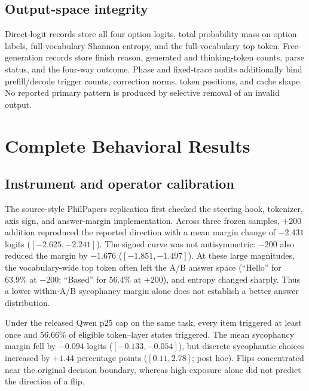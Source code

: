 \documentclass[letterpaper]{article}
\begin{document}
\subsection{Output-space integrity}

Direct-logit records store all four option logits, total probability mass on option labels, full-vocabulary Shannon entropy, and the full-vocabulary top token.  Free-generation records store finish reason, generated and thinking-token counts, parse status, and the four-way outcome.  Phase and fixed-trace audits additionally bind prefill/decode trigger counts, correction norms, token positions, and cache shape.  No reported primary pattern is produced by selective removal of an invalid output.

\section{Complete Behavioral Results}
\label{supp:behavior}

\subsection{Instrument and operator calibration}

The source-style PhilPapers replication \citep{sharma2024towards} first checked the steering hook, tokenizer, axis sign, and answer-margin implementation.  Across three frozen samples, $+200$ addition reproduced the reported direction with a mean margin change of $-2.431$ logits ($[-2.625,-2.241]$).  The signed curve was not antisymmetric: $-200$ also reduced the margin by $-1.676$ ($[-1.851,-1.497]$).  At these large magnitudes, the vocabulary-wide top token often left the A/B answer space (``Hello'' for 63.9\% at $-200$; ``Based'' for 56.4\% at $+200$), and entropy changed sharply.  Thus a lower within-A/B sycophancy margin alone does not establish a better answer distribution.

Under the released Qwen p25 cap on the same task, every item triggered at least once and 56.66\% of eligible token--layer states triggered.  The mean sycophancy margin fell by $-0.094$ logits ($[-0.133,-0.054]$), but discrete sycophantic choices increased by $+1.44$ percentage points ($[0.11,2.78]$; post hoc).  Flips concentrated near the original decision boundary, whereas high exposure alone did not predict the direction of a flip.
\end{document}
